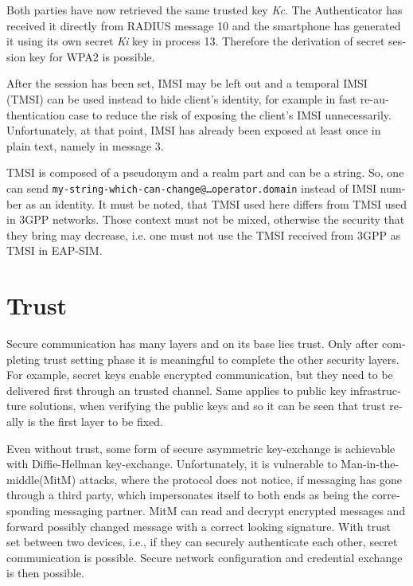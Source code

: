 \documentclass[12pt,a4paper,english]{tutthesis}
\begin{document}
\begin{otherlanguage}{english}
Both parties have now retrieved the same trusted key \emph{Kc}. The
Authenticator has received it directly from RADIUS message 10 and the
smartphone has generated it using its own secret \emph{Ki} key in
process 13.
Therefore the derivation of secret session key for WPA2 is possible.

After the session has been set, IMSI may be left out and a temporal IMSI
(TMSI) can be used instead to hide client's identity, for example in
fast re-authentication case to reduce the risk of exposing the client's
IMSI unnecessarily. Unfortunately, at that point, IMSI has already
been exposed at least once in plain text, namely in message 3.

TMSI is composed of a pseudonym and a realm part and can be a
string. So, one can send 
\texttt{my-string-which-can-change@…operator.domain} instead of 
IMSI number as an identity. 
It must be noted, that TMSI used here differs from TMSI used in 3GPP
networks. Those context must not be mixed, otherwise the security that
they bring may decrease, i.e. one must not use the TMSI received from
3GPP as TMSI in EAP-SIM.
\section{Trust}
\label{sec-2-7}

Secure communication has many layers and on its base lies trust. 
Only after completing trust setting phase it is meaningful to complete
the other security layers. For example, secret keys enable encrypted
communication, but they need to be delivered first through an trusted
channel. Same applies to public key infrastructure solutions, when
verifying the public keys and so it can be seen that trust
really is the first layer to be fixed.



Even without trust, some form of secure asymmetric key-exchange is achievable
with Diffie-Hellman key-exchange\cite{diffie1976new}. Unfortunately, it is vulnerable
to Man-in-the-middle(MitM) attacks, where the protocol does not notice, 
if messaging has gone through a third party, which impersonates itself to 
both ends as being the corresponding messaging partner. MitM can
read and decrypt encrypted messages and forward possibly changed message with
a correct looking signature.
With trust set between two devices, i.e.,  if they can securely
authenticate each other, secret communication is possible. 
Secure network configuration and credential exchange is then possible.




\end{otherlanguage}
\end{document}
